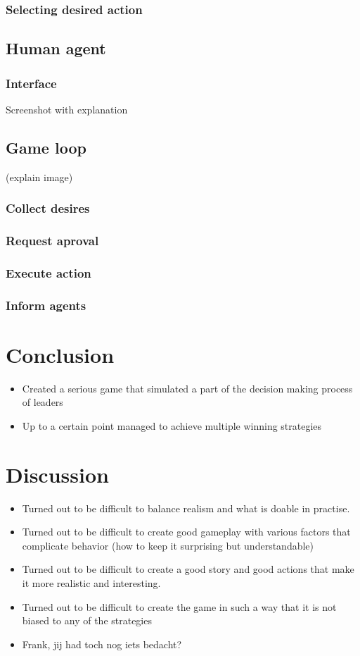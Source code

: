 \documentclass[11pt,a4paper]{article}
\begin{document}
    \subsubsection{Selecting desired action}
  \subsection{Human agent}
    \subsubsection{Interface}
    Screenshot with explanation
  \subsection{Game loop} 
  (explain image)
    \subsubsection{Collect desires}
    \subsubsection{Request aproval}
    \subsubsection{Execute action}
    \subsubsection{Inform agents}
\section{Conclusion}
  \begin{itemize}
    \item Created a serious game that simulated a part of the decision making process of leaders
    \item Up to a certain point managed to achieve multiple winning strategies
  \end{itemize}
\section{Discussion}
  \begin{itemize}
    \item Turned out to be difficult to balance realism and what is doable in practise.
    \item Turned out to be difficult to create good gameplay with various factors that complicate behavior (how to keep it surprising but understandable)
    \item Turned out to be difficult to create a good story and good actions that make it more realistic and interesting.
    \item Turned out to be difficult to create the game in such a way that it is not biased to any of the strategies
    \item Frank, jij had toch nog iets bedacht?
  \end{itemize}
\end{document}
